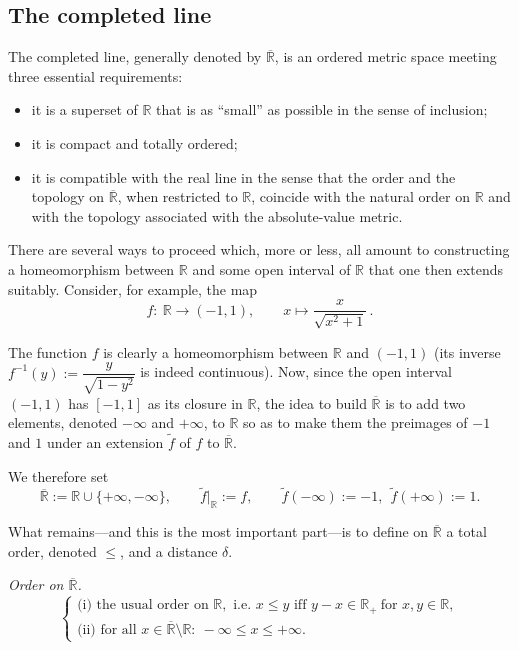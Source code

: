 \documentclass[11pt]{article}
\theoremstyle{definition}
\begin{document}
\subsection{The completed line}

The completed line, generally denoted by $\overline{\mathbb{R}}$, is an ordered metric space meeting three essential requirements:
\begin{itemize}[leftmargin=1.5em]
\item it is a superset of $\mathbb{R}$ that is as ``small'' as possible in the sense of inclusion;
\item it is compact and totally ordered;
\item it is compatible with the real line in the sense that the order and the topology on $\overline{\mathbb{R}}$, when restricted to $\mathbb{R}$, coincide with the natural order on $\mathbb{R}$ and with the topology associated with the absolute-value metric.
\end{itemize}

There are several ways to proceed which, more or less, all amount to constructing a homeomorphism between $\mathbb{R}$ and some open interval of $\mathbb{R}$ that one then extends suitably.
Consider, for example, the map
\[
f:\ \mathbb{R}\longrightarrow (-1,1),\qquad
x\longmapsto \frac{x}{\sqrt{x^2+1}}\, .
\]

The function $f$ is clearly a homeomorphism between $\mathbb{R}$ and $(-1,1)$ (its inverse
$f^{-1}(y):=\dfrac{y}{\sqrt{1-y^2}}$ is indeed continuous).
Now, since the open interval $(-1,1)$ has $[-1,1]$ as its closure in $\mathbb{R}$, the idea to build $\overline{\mathbb{R}}$ is to add two elements, denoted $-\infty$ and $+\infty$, to $\mathbb{R}$ so as to make them the preimages of $-1$ and $1$ under an extension $\tilde f$ of $f$ to $\overline{\mathbb{R}}$.

We therefore set
\begin{equation}\label{eq:2.1}
\overline{\mathbb{R}}:=\mathbb{R}\cup\{+\infty,-\infty\},
\qquad
\tilde f\big|_{\mathbb{R}}:=f,\qquad
\tilde f(-\infty):=-1,\ \ \tilde f(+\infty):=1 .
\end{equation}

What remains—and this is the most important part—is to define on $\overline{\mathbb{R}}$ a total order, denoted $\le$, and a distance $\delta$.

\medskip\noindent
\textit{Order on $\overline{\mathbb{R}}$.}
\[
\begin{cases}
\text{(i) the usual order on }\mathbb{R},\text{ i.e.\ }x\le y\text{ iff }y-x\in\mathbb{R}_+\ \text{for }x,y\in\mathbb{R},\\[2pt]
\text{(ii) for all }x\in\overline{\mathbb{R}}\setminus\mathbb{R}:\ -\infty\le x\le +\infty .
\end{cases}
\]
\end{document}
